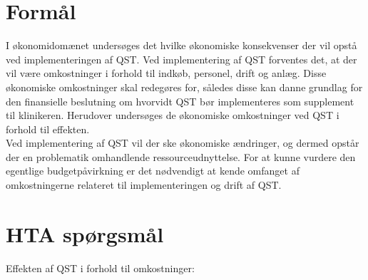 \section{Formål}
I økonomidomænet undersøges det hvilke økonomiske konsekvenser der vil opstå ved implementeringen af QST. Ved implementering af QST forventes det, at der vil være omkostninger i forhold til indkøb, personel, drift og anlæg. Disse økonomiske omkostninger skal redegøres for, således disse kan danne grundlag for den finansielle beslutning om hvorvidt QST bør implementeres som supplement til klinikeren. Herudover undersøges de økonomiske omkostninger ved QST i forhold til effekten.\\ 
Ved implementering af  QST vil der ske økonomiske ændringer, og dermed opstår der en problematik omhandlende ressourceudnyttelse. For at kunne vurdere den egentlige budgetpåvirkning er det nødvendigt at kende omfanget af  omkostningerne relateret til implementeringen og drift af QST. 

\section{HTA spørgsmål}
Effekten af QST i forhold til omkostninger:


%
%
%

